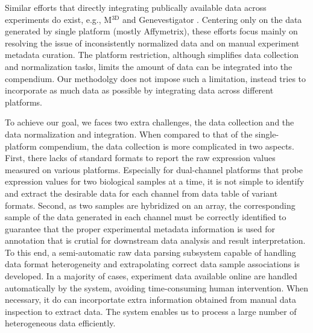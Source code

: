 Similar efforts that directly integrating publically available data across
experiments do exist, e.g., M$^{\textrm{3D}}$ \cite{Faith2008} and
Genevestigator \cite{Hruz2008}.
%
Centering only on the data generated by single platform (mostly
Affymetrix), these efforts focus mainly on resolving the issue of
inconsistently normalized data and on manual experiment metadata curation.
%
The platform restriction, although simplifies data collection and
normalization tasks, limits the amount of data can be integrated into the
compendium.
Our methodolgy does not impose such a limitation, instead tries to
incorporate as much data as possible by integrating data across different
platforms.

To achieve our goal, we faces two extra challenges, the data collection and
the data normalization and integration.
%
When compared to that of the single-platform compendium, the data
collection is more complicated in two aspects.
%
First, there lacks of standard formats to report the raw expression values
measured on various platforms.  Especially for dual-channel platforms that
probe expression values for two biological samples at a time, it is not
simple to identify and extract the desirable data for each channel from
data table of variant formats.
%
Second, as two samples are hybridized on an array, the corresponding sample
of the data generated in each channel must be correctly identified to
guarantee that the proper experimental metadata information is used for
annotation that is crutial for downstream data analysis and result
interpretation.
%
To this end, a semi-automatic raw data parsing subsystem capable of
handling data format heterogeneity and extrapolating correct data sample
associations is developed.
%
In a majority of cases, experiment data available online are handled
automatically by the system, avoiding time-consuming human intervention.
%
When necessary, it do can incorportate extra information obtained from
manual data inspection to extract data.
%
The system enables us to process a large number of heterogeneous data
efficiently.


